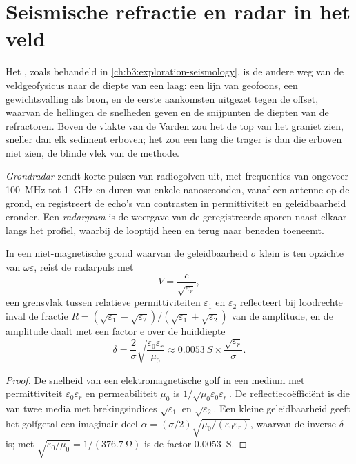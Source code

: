 \section{Seismische refractie en radar in het veld}\label{sec:b3:field-lab-methods-3:radar}

Het , zoals behandeld in \cref{ch:b3:exploration-seismology},
is de andere weg van de veldgeofysicus naar de diepte van een laag: een lijn
van geofoons, een gewichtsvalling als bron, en de eerste aankomsten
uitgezet tegen de offset, waarvan de hellingen de snelheden geven en de
snijpunten de diepten van de refractoren. Boven de vlakte van de Varden
zou het de top van het graniet zien, sneller dan elk sediment erboven; het
zou een laag die trager is dan die erboven niet zien, de blinde vlek van de
methode.

\begin{definition}\label{def:b3:field-lab-methods-3:gpr}
\emph{Grondradar} zendt korte pulsen van radiogolven uit,
met frequenties van ongeveer \qty{100}{MHz}
tot \qty{1}{GHz} en duren van enkele nanoseconden, vanaf een antenne op
de grond, en registreert de echo's van contrasten in permittiviteit en
geleidbaarheid eronder. Een \emph{radargram} is de weergave
van de geregistreerde sporen naast elkaar langs het profiel, waarbij de
looptijd heen en terug naar beneden toeneemt.
\end{definition}

\begin{proposition}\label{prop:b3:field-lab-methods-3:radar}
In een niet-magnetische grond waarvan de geleidbaarheid $\sigma$ klein is
ten opzichte van $\omega\varepsilon$, reist de radarpuls met
\[
V = \frac{c}{\sqrt{\varepsilon_r}} ,
\]
een grensvlak tussen relatieve permittiviteiten $\varepsilon_1$ en
$\varepsilon_2$ reflecteert bij loodrechte inval de fractie $R =
(\sqrt{\varepsilon_1} - \sqrt{\varepsilon_2})/(\sqrt{\varepsilon_1} +
\sqrt{\varepsilon_2})$ van de amplitude, en de amplitude daalt met een
factor $\mathrm{e}$ over de huiddiepte
\[
\delta = \frac{2}{\sigma}\sqrt{\frac{\varepsilon_0\varepsilon_r}{\mu_0}}
       \approx \qty{0.0053}{S}\times\frac{\sqrt{\varepsilon_r}}{\sigma} .
\]
\end{proposition}

\begin{proof}
De snelheid van een elektromagnetische golf in een medium met permittiviteit
$\varepsilon_0\varepsilon_r$ en permeabiliteit $\mu_0$ is
$1/\sqrt{\mu_0\varepsilon_0\varepsilon_r}$. De reflectiecoëfficiënt
is die van twee media met brekingsindices $\sqrt{\varepsilon_1}$ en
$\sqrt{\varepsilon_2}$. Een kleine geleidbaarheid geeft het golfgetal een
imaginair deel $\alpha = (\sigma/2)\sqrt{\mu_0/(\varepsilon_0
\varepsilon_r)}$, waarvan de inverse $\delta$ is; met $\sqrt{\varepsilon_0/
\mu_0} = 1/(\qty{376.7}{\ohm})$ is de factor \qty{0.0053}{S}.
\end{proof}

